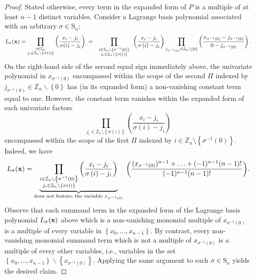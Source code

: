 \begin{proof}
  Stated otherwise, every term in the expanded form of $P$ is
a multiple of at least $n-1$ distinct variables. Consider a Lagrange
basis polynomial associated with an arbitrary $\sigma\in\text{S}_{n}$:
\[
L_{\sigma}({\bf x})=\prod_{\substack{i\in\mathbb{Z}_{n}\\
j_{i}\in\mathbb{Z}_{n}\setminus\{\sigma(i)\}
}
}\bigg(\frac{x_{i}-j_{i}}{\sigma(i)-j_{i}}\bigg)\;=\;\prod_{\begin{array}{c}
\substack{i\in\mathbb{Z}_{n}\setminus\{\sigma^{-1}(0)\}\\
j_{i}\in\mathbb{Z}_{n}\backslash\{\sigma(i)\}
}
\end{array}}\left(\frac{x_{i}-j_{i}}{\sigma\left(i\right)-j_{i}}\right)\prod_{j_{\sigma^{-1}\left(0\right)}\in\mathbb{Z}_{n}\backslash\left\{ 0\right\} }\left(\frac{x_{\sigma^{-1}\left(0\right)}-j_{\sigma^{-1}\left(0\right)}}{0-j_{\sigma^{-1}\left(0\right)}}\right).
\]
On the right-hand side of the second equal sign immediately above,
the univariate polynomial in $x_{\sigma^{-1}(0)}$ encompassed within the scope of the second $\Pi$
indexed by $j_{\sigma^{-1}\left(0\right)}\in\mathbb{Z}_{n}\backslash\left\{ 0\right\} $
has (in its expanded form) a non-vanishing constant term equal to
one. However, the constant term vanishes within the expanded form
of each univariate factors
\[
\underset{j_{i}\in\mathbb{Z}_{n}\setminus\left\{ \sigma\left(i\right)\right\} }{\prod}\left(\frac{x_{i}-j_{i}}{\sigma\left(i\right)-j_{i}}\right)
\]
encompassed within the scope of the first $\Pi$ indexed by $i\in\mathbb{Z}_{n}\setminus\left\{ \sigma^{-1}\left(0\right)\right\}$. Indeed, we have
\[
L_{\sigma}({\bf x})=\underbrace{\prod_{\substack{i\in\mathbb{Z}_{n}\setminus\left\{ \sigma^{-1}\left(0\right)\right\} \\
j_{i}\in\mathbb{Z}_{n}\setminus\left\{ \sigma\left(i\right)\right\} 
}
}\bigg(\frac{x_{i}-j_{i}}{\sigma\left(i\right)-j_{i}}\bigg)}_{\text{does not feature the variable }x_{\sigma^{-1}\left(0\right)}}\:\bigg(\frac{(x_{\sigma^{-1}\left(0\right)})^{n-1}+\ldots+(-1)^{n-1}(n-1)!}{(-1)^{n-1}(n-1)!}\bigg).
\]
Observe that each summand term in the expanded form of the Lagrange
basis polynomial $L_{\sigma}({\bf x})$ above which is a non-vanishing
monomial multiple of $x_{\sigma^{-1}\left(0\right)}$ is a multiple
of every variable in $\left\{ x_{0},\ldots,x_{n-1}\right\} $. By
contrast, every non-vanishing monomial summand term which
is not a multiple of $x_{\sigma^{-1}\left(0\right)}$ is a multiple
of every other variables, i.e., variables in the set $\left\{ x_{0},\ldots,x_{n-1}\right\} \backslash\left\{ x_{\sigma^{-1}\left(0\right)}\right\} $.
Applying the same argument to each $\sigma\in\text{S}_{n}$ yields
the desired claim.
\end{proof}

